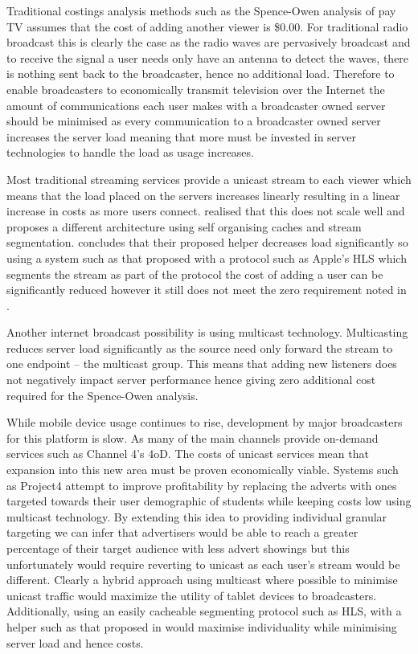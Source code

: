 Traditional costings analysis methods such as the Spence-Owen analysis of pay TV assumes that the cost of adding another viewer is \$0.00\citet{broadcastEconomics}. For traditional radio broadcast this is clearly the case as the radio waves are pervasively broadcast and to receive the signal a user needs only have an antenna to detect the waves, there is nothing sent back to the broadcaster, hence no additional load. Therefore to enable broadcasters to economically transmit television over the Internet the amount of communications each user makes with a broadcaster owned server should be minimised as every communication to a broadcaster owned server increases the server load meaning that more must be invested in server technologies to handle the load as usage increases.

Most traditional streaming services provide a unicast stream to each viewer which means that the load placed on the servers increases linearly resulting in a linear increase in costs as more users connect. \citet{cachedStream} realised that this does not scale well and proposes a different architecture using self organising caches and stream segmentation. \citet{cachedStream} concludes that their proposed helper decreases load significantly so using a system such as that proposed with a protocol such as Apple's HLS\cite{HLS} which segments the stream as part of the protocol the cost of adding a user can be significantly reduced however it still does not meet the zero requirement noted in \citep{broadcastEconomics}.

Another internet broadcast possibility is using multicast technology\citep{multicast}. Multicasting reduces server load significantly as the source need only forward the stream to one endpoint -- the multicast group. This means that adding new listeners does not negatively impact server performance hence giving zero additional cost required for the Spence-Owen analysis\citep{broadcastEconomics}.

While mobile device usage continues to rise, development by major broadcasters for this platform is slow. As many of the main channels provide on-demand services such as Channel 4's 4oD. The costs of unicast services mean that expansion into this new area must be proven economically viable. Systems such as Project4 attempt to improve profitability by replacing the adverts with ones targeted towards their user demographic of students while keeping costs low using multicast technology. By extending this idea to providing individual granular targeting we can infer that advertisers would be able to reach a greater percentage of their target audience with less advert showings but this unfortunately would require reverting to unicast as each user's stream would be different. Clearly a hybrid approach using multicast where possible to minimise unicast traffic would maximize the utility of tablet devices to broadcasters. Additionally, using an easily cacheable segmenting protocol such as HLS\citep{HLS}, with a helper such as that proposed in \citep{cachedStream} would maximise individuality while minimising server load and hence costs.

